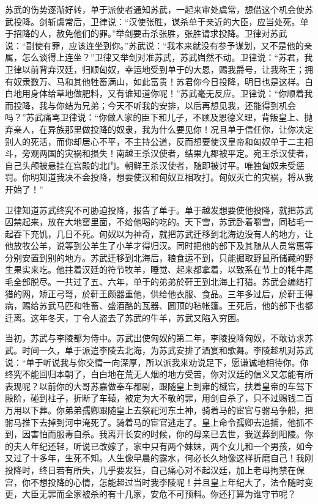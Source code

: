 \documentclass[12pt,UTF-8,openany]{ctexbook}
\begin{document}
\begin{normalsize}
    苏武的伤势逐渐好转，单于派使者通知苏武，一起来审处虞常，想借这个机会使苏武投降。剑斩虞常后，卫律说：“汉使张胜，谋杀单于亲近的大臣，应当处死。单于招降的人，赦免他们的罪。”举剑要击杀张胜，张胜请求投降。卫律对苏武说：“副使有罪，应该连坐到你。”苏武说：“我本来就没有参予谋划，又不是他的亲属，怎么谈得上连坐？”卫律又举剑对准苏武，苏武岿然不动。卫律说：“苏君，我卫律以前背弃汉廷，归顺匈奴，幸运地受到单于的大恩，赐我爵号，让我称王；拥有奴隶数万、马和其他牲畜满山，如此富贵！苏君你今日投降，明日也是这样。白白地用身体给草地做肥料，又有谁知道你呢！”苏武毫无反应。卫律说：“你顺着我而投降，我与你结为兄弟；今天不听我的安排，以后再想见我，还能得到机会吗？”苏武痛骂卫律说：“你做人家的臣下和儿子，不顾及恩德义理，背叛皇上、抛弃亲人，在异族那里做投降的奴隶，我为什么要见你！况且单于信任你，让你决定别人的死活，而你却居心不平，不主持公道，反而想要使汉皇帝和匈奴单于二主相斗，旁观两国的灾祸和损失！南越王杀汉使者，结果九郡被平定。宛王杀汉使者，自己头颅被悬挂在宫殿的北门。朝鲜王杀汉使者，随即被讨平。唯独匈奴未受惩罚。你明知道我决不会投降，想要使汉和匈奴互相攻打。匈奴灭亡的灾祸，将从我开始了！”
    
    卫律知道苏武终究不可胁迫投降，报告了单于。单于越发想要使他投降，就把苏武囚禁起来，放在大地窖里面，不给他喝的吃的。天下雪，苏武卧着嚼雪，同毡毛一起吞下充饥，几日不死。匈奴以为神奇，就把苏武迁移到北海边没有人的地方，让他放牧公羊，说等到公羊生了小羊才得归汉。同时把他的部下及其随从人员常惠等分别安置到别的地方。苏武迁移到北海后，粮食运不到，只能掘取野鼠所储藏的野生果实来吃。他拄着汉廷的符节牧羊，睡觉、起来都拿着，以致系在节上的牦牛尾毛全部脱尽。一共过了五、六年，单于的弟弟於靬王到北海上打猎。苏武会编结打猎的网，矫正弓弩，於靬王颇器重他，供给他衣服、食品。三年多过后，於靬王得病，赐给苏武马匹和牲畜、盛酒酪的瓦器、圆顶的毡帐篷。王死后，他的部下也都迁离。这年冬天，丁令人盗去了苏武的牛羊，苏武又陷入穷困。
    
    当初，苏武与李陵都为侍中。苏武出使匈奴的第二年，李陵投降匈奴，不敢访求苏武。时间一久，单于派遣李陵去北海，为苏武安排了酒宴和歌舞。李陵趁机对苏武说：“单于听说我与你交情一向深厚，所以派我来劝说足下，愿谦诚地相待你。你终究不能回归本朝了，白白地在荒无人烟的地方受苦，你对汉廷的信义又怎能有所表现呢？以前你的大哥苏嘉做奉车都尉，跟随皇上到雍的棫宫，扶着皇帝的车驾下殿阶，碰到柱子，折断了车辕，被定为大不敬的罪，用剑自杀了，只不过赐钱二百万用以下葬。你弟弟孺卿跟随皇上去祭祀河东土神，骑着马的宦官与驸马争船，把驸马推下去掉到河中淹死了。骑着马的宦官逃走了。皇上命令孺卿去追捕，他抓不到，因害怕而服毒自杀。我离开长安的时候，你的母亲已去世，我送葬到阳陵。你的夫人年纪还轻，听说已改嫁了，家中只有两个妹妹，两个女儿和一个男孩，如今又过了十多年，生死不知。人生像早晨的露水，何必长久地像这样折磨自己！我刚投降时，终日若有所失，几乎要发狂，自己痛心对不起汉廷，加上老母拘禁在保宫，你不想投降的心情，怎能超过当时我李陵呢！并且皇上年纪大了，法令随时变更，大臣无罪而全家被杀的有十几家，安危不可预料。你还打算为谁守节呢？
    

\end{normalsize}
\end{document}
